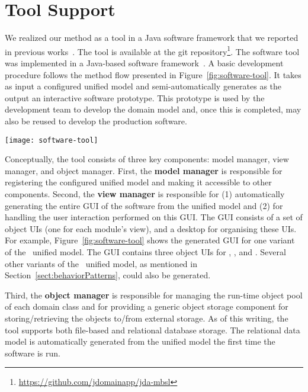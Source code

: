 \section{Tool Support}
\label{sect:tool} %

We realized our method as a tool in a Java software framework that we reported in previous works~\cite{le_domain_2018}. The tool is available at the git repository\footnote{\url{https://github.com/jdomainapp/jda-mbsl}}. The software tool was implemented in a Java-based software framework~\cite{le_jdomainapp_2017}. A basic development procedure follows the method flow presented in Figure~\ref{fig:software-tool}. It takes as input a configured unified model and semi-automatically generates as the output an interactive software prototype. This prototype is used by the development team to develop the domain model and, once this is completed, may also be reused to develop the production software.

\begin{figure*}[ht]
	\centering
	\texttt{[image: software-tool]}
	\caption{The GUI of \courseman~software generated by the tool: (1) desktop, 
		(2-4) the object UIs of , , and .} %
	\label{fig:software-tool}
\end{figure*}

Conceptually, the tool consists of three key components: model manager, view manager, and object manager. First, the \textbf{model manager} is responsible for registering the configured unified model and making it accessible to other components. 
Second, the \textbf{view manager} is responsible for (1) automatically generating the entire GUI of the software from the unified model and (2) for handling the user interaction performed on this GUI. The GUI consists of a set of object UIs (one for each module's view), and a desktop for organising these UIs. For example, Figure~\ref{fig:software-tool} shows the generated GUI for one variant of the \courseman~unified model. The GUI contains three object UIs for , , and .
Several other variants of the \courseman~unified model, as mentioned in Section~\ref{sect:behaviorPatterns}, could also be generated. 

Third, the \textbf{object manager} is responsible for managing the run-time object pool of each domain class and for providing a generic object storage component for storing/retrieving the objects to/from external storage. As of this writing, the tool supports both file-based and relational database storage. The relational data model is automatically generated from the unified model the first time the software is run.